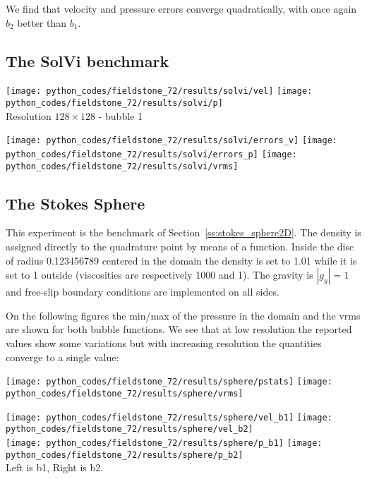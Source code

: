 We find that velocity and pressure errors converge quadratically, with 
once again $b_2$ better than $b_1$.


\subsection*{The SolVi benchmark}


\begin{center}
\texttt{[image: python\_codes/fieldstone\_72/results/solvi/vel]}
\texttt{[image: python\_codes/fieldstone\_72/results/solvi/p]}\\
{\captionfont Resolution $128\times128$ - bubble 1 }
\end{center}


\begin{center}
\texttt{[image: python\_codes/fieldstone\_72/results/solvi/errors\_v]}
\texttt{[image: python\_codes/fieldstone\_72/results/solvi/errors\_p]}
\texttt{[image: python\_codes/fieldstone\_72/results/solvi/vrms]}
\end{center}



\subsection*{The Stokes Sphere}

This experiment is the benchmark of Section~\ref{ss:stokes_sphere2D}. 
The density is assigned directly to the 
quadrature point by means of a function. Inside the disc of radius 0.123456789 centered in the domain 
the density is set to 1.01 while it is set to 1 outside 
(viscosities are respectively 1000 and 1). The gravity is $|g_y|=1$ and 
free-slip boundary conditions are implemented on all sides. 

On the following figures the min/max of the pressure in the domain and the vrms 
are shown for both bubble functions. We see that at low resolution the reported 
values show some variations but with increasing resolution the quantities converge to a single value:

\begin{center}
\texttt{[image: python\_codes/fieldstone\_72/results/sphere/pstats]}
\texttt{[image: python\_codes/fieldstone\_72/results/sphere/vrms]}
\end{center}

\begin{center}
\texttt{[image: python\_codes/fieldstone\_72/results/sphere/vel\_b1]}
\texttt{[image: python\_codes/fieldstone\_72/results/sphere/vel\_b2]}\\
\texttt{[image: python\_codes/fieldstone\_72/results/sphere/p\_b1]}
\texttt{[image: python\_codes/fieldstone\_72/results/sphere/p\_b2]}\\
{\captionfont Left is b1, Right is b2.}
\end{center}

